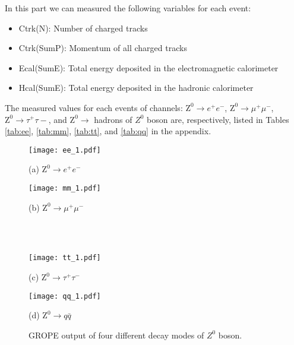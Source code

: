 In this part we can measured the following variables for each event:
\begin{itemize}
	\item Ctrk(N): Number of charged tracks
	\item Ctrk(SumP): Momentum of all charged tracks
	\item Ecal(SumE): Total energy deposited in the electromagnetic calorimeter
	\item Hcal(SumE): Total energy deposited in the hadronic calorimeter
\end{itemize}
The measured values for each events of channels: $ \text{Z}^0\rightarrow e^+e^- $, $ \text{Z}^0\rightarrow \mu^+\mu^- $, $ \text{Z}^0\rightarrow \tau^+\tau-$,  and $ \text{Z}^0\rightarrow  $ hadrons of $ Z^0 $ boson are, respectively, listed in Tables \ref{tab:ee}, \ref{tab:mm}, \ref{tab:tt}, and \ref{tab:qq} in the appendix.



\begin{figure}[H]   
	\begin{minipage}[t]{0.5\textwidth}
		\texttt{[image: ee\_1.pdf]}
		\begin{center}
			{(a) $  \text{Z}^0\rightarrow e^+e^- $}
		\end{center}
	\end{minipage} \quad
	\begin{minipage}[t]{0.5\textwidth}
		\texttt{[image: mm\_1.pdf]}
		\begin{center}
			{(b) $ \text{Z}^0\rightarrow \mu^+\mu^- $}
		\end{center}
	\end{minipage}\\\\
	
	
	\begin{minipage}[t]{0.5\textwidth}
		\texttt{[image: tt\_1.pdf]}
		\begin{center}
			{(c) $ \text{Z}^0\rightarrow \tau^+\tau^- $}
		\end{center}
	\end{minipage} \quad
\begin{minipage}[t]{0.5\textwidth}
		\texttt{[image: qq\_1.pdf]}
		\begin{center}
			{(d) $ \text{Z}^0\rightarrow q \bar{q}$}
		\end{center}
	\end{minipage}
\caption{ GROPE output of four different decay modes of $ Z^0 $ boson.}
\label{fig:eventsDisplay}	
\end{figure}

